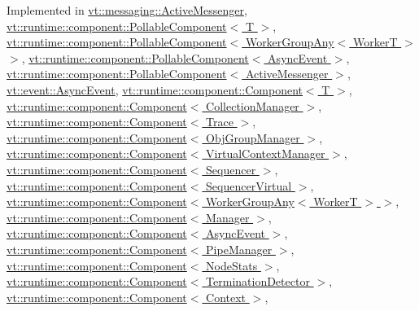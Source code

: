 Implemented in \hyperlink{structvt_1_1messaging_1_1_active_messenger_a4cd83c125e144ecbd9425fa7cd194538}{vt\+::messaging\+::\+Active\+Messenger}, \hyperlink{structvt_1_1runtime_1_1component_1_1_pollable_component_a34cad810026224d550cd9b0c9d1eff22}{vt\+::runtime\+::component\+::\+Pollable\+Component$<$ T $>$}, \hyperlink{structvt_1_1runtime_1_1component_1_1_pollable_component_a34cad810026224d550cd9b0c9d1eff22}{vt\+::runtime\+::component\+::\+Pollable\+Component$<$ Worker\+Group\+Any$<$ Worker\+T $>$ $>$}, \hyperlink{structvt_1_1runtime_1_1component_1_1_pollable_component_a34cad810026224d550cd9b0c9d1eff22}{vt\+::runtime\+::component\+::\+Pollable\+Component$<$ Async\+Event $>$}, \hyperlink{structvt_1_1runtime_1_1component_1_1_pollable_component_a34cad810026224d550cd9b0c9d1eff22}{vt\+::runtime\+::component\+::\+Pollable\+Component$<$ Active\+Messenger $>$}, \hyperlink{structvt_1_1event_1_1_async_event_a36f18429bc2856a30c8f7fd70654e0a4}{vt\+::event\+::\+Async\+Event}, \hyperlink{structvt_1_1runtime_1_1component_1_1_component_a1dab11d9eb5bed8dfd5a3bb8fdf67f5a}{vt\+::runtime\+::component\+::\+Component$<$ T $>$}, \hyperlink{structvt_1_1runtime_1_1component_1_1_component_a1dab11d9eb5bed8dfd5a3bb8fdf67f5a}{vt\+::runtime\+::component\+::\+Component$<$ Collection\+Manager $>$}, \hyperlink{structvt_1_1runtime_1_1component_1_1_component_a1dab11d9eb5bed8dfd5a3bb8fdf67f5a}{vt\+::runtime\+::component\+::\+Component$<$ Trace $>$}, \hyperlink{structvt_1_1runtime_1_1component_1_1_component_a1dab11d9eb5bed8dfd5a3bb8fdf67f5a}{vt\+::runtime\+::component\+::\+Component$<$ Obj\+Group\+Manager $>$}, \hyperlink{structvt_1_1runtime_1_1component_1_1_component_a1dab11d9eb5bed8dfd5a3bb8fdf67f5a}{vt\+::runtime\+::component\+::\+Component$<$ Virtual\+Context\+Manager $>$}, \hyperlink{structvt_1_1runtime_1_1component_1_1_component_a1dab11d9eb5bed8dfd5a3bb8fdf67f5a}{vt\+::runtime\+::component\+::\+Component$<$ Sequencer $>$}, \hyperlink{structvt_1_1runtime_1_1component_1_1_component_a1dab11d9eb5bed8dfd5a3bb8fdf67f5a}{vt\+::runtime\+::component\+::\+Component$<$ Sequencer\+Virtual $>$}, \hyperlink{structvt_1_1runtime_1_1component_1_1_component_a1dab11d9eb5bed8dfd5a3bb8fdf67f5a}{vt\+::runtime\+::component\+::\+Component$<$ Worker\+Group\+Any$<$ Worker\+T $>$ $>$}, \hyperlink{structvt_1_1runtime_1_1component_1_1_component_a1dab11d9eb5bed8dfd5a3bb8fdf67f5a}{vt\+::runtime\+::component\+::\+Component$<$ Manager $>$}, \hyperlink{structvt_1_1runtime_1_1component_1_1_component_a1dab11d9eb5bed8dfd5a3bb8fdf67f5a}{vt\+::runtime\+::component\+::\+Component$<$ Async\+Event $>$}, \hyperlink{structvt_1_1runtime_1_1component_1_1_component_a1dab11d9eb5bed8dfd5a3bb8fdf67f5a}{vt\+::runtime\+::component\+::\+Component$<$ Pipe\+Manager $>$}, \hyperlink{structvt_1_1runtime_1_1component_1_1_component_a1dab11d9eb5bed8dfd5a3bb8fdf67f5a}{vt\+::runtime\+::component\+::\+Component$<$ Node\+Stats $>$}, \hyperlink{structvt_1_1runtime_1_1component_1_1_component_a1dab11d9eb5bed8dfd5a3bb8fdf67f5a}{vt\+::runtime\+::component\+::\+Component$<$ Termination\+Detector $>$}, \hyperlink{structvt_1_1runtime_1_1component_1_1_component_a1dab11d9eb5bed8dfd5a3bb8fdf67f5a}{vt\+::runtime\+::component\+::\+Component$<$ Context $>$}, 